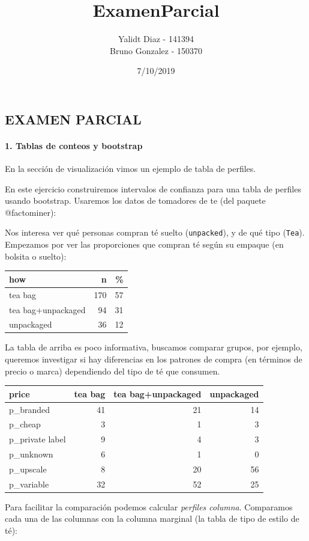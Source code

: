 \documentclass[]{article}
\title{ExamenParcial}
\author{Yalidt Diaz - 141394 \\ Bruno Gonzalez - 150370}
\date{7/10/2019}
\let\oldparagraph\paragraph
\renewcommand{\paragraph}[1]{\oldparagraph{#1}\mbox{}}
\begin{document}
\maketitle

\hypertarget{examen-parcial}{%
\subsection{EXAMEN PARCIAL}\label{examen-parcial}}

\hypertarget{tablas-de-conteos-y-bootstrap}{%
\paragraph{1. Tablas de conteos y
bootstrap}\label{tablas-de-conteos-y-bootstrap}}

En la sección de visualización vimos un ejemplo de tabla de perfiles.

En este ejercicio construiremos intervalos de confianza para una tabla
de perfiles usando bootstrap. Usaremos los datos de tomadores de te (del
paquete @factominer):

Nos interesa ver qué personas compran té suelto (\texttt{unpacked}), y
de qué tipo (\texttt{Tea}). Empezamos por ver las proporciones que
compran té según su empaque (en bolsita o suelto):

\begin{longtable}[]{@{}lrr@{}}
\toprule
how & n & \%\tabularnewline
\midrule
\endhead
tea bag & 170 & 57\tabularnewline
tea bag+unpackaged & 94 & 31\tabularnewline
unpackaged & 36 & 12\tabularnewline
\bottomrule
\end{longtable}

La tabla de arriba es poco informativa, buscamos comparar grupos, por
ejemplo, queremos investigar si hay diferencias en los patrones de
compra (en términos de precio o marca) dependiendo del tipo de té que
consumen.

\begin{longtable}[]{@{}lrrr@{}}
\toprule
price & tea bag & tea bag+unpackaged & unpackaged\tabularnewline
\midrule
\endhead
p\_branded & 41 & 21 & 14\tabularnewline
p\_cheap & 3 & 1 & 3\tabularnewline
p\_private label & 9 & 4 & 3\tabularnewline
p\_unknown & 6 & 1 & 0\tabularnewline
p\_upscale & 8 & 20 & 56\tabularnewline
p\_variable & 32 & 52 & 25\tabularnewline
\bottomrule
\end{longtable}

Para facilitar la comparación podemos calcular \emph{perfiles columna}.
Comparamos cada una de las columnas con la columna marginal (la tabla de
tipo de estilo de té):
\end{document}
